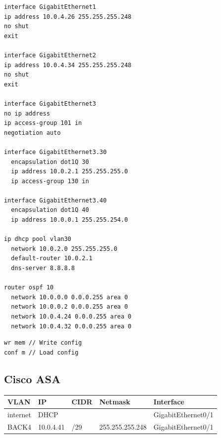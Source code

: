 \documentclass[11pt,parskip=half]{scrartcl}
\begin{document}
\begin{lstlisting}[basicstyle=\small, frame=single]
interface GigabitEthernet1
ip address 10.0.4.26 255.255.255.248
no shut
exit

interface GigabitEthernet2
ip address 10.0.4.34 255.255.255.248
no shut
exit

interface GigabitEthernet3
no ip address
ip access-group 101 in
negotiation auto

interface GigabitEthernet3.30
  encapsulation dot1Q 30
  ip address 10.0.2.1 255.255.255.0
  ip access-group 130 in

interface GigabitEthernet3.40
  encapsulation dot1Q 40
  ip address 10.0.0.1 255.255.254.0

ip dhcp pool vlan30
  network 10.0.2.0 255.255.255.0
  default-router 10.0.2.1
  dns-server 8.8.8.8

router ospf 10
  network 10.0.0.0 0.0.0.255 area 0
  network 10.0.0.2 0.0.0.255 area 0
  network 10.0.4.24 0.0.0.255 area 0
  network 10.0.4.32 0.0.0.255 area 0
\end{lstlisting}

\begin{verbatim}
wr mem // Write config
conf m // Load config 
\end{verbatim}

\subsection{{\bfseries\sffamily } Cisco ASA}
\label{sec:org441b035}

\begin{center}
\begin{tabular}{lllll}
VLAN & IP & CIDR & Netmask & Interface\\
\hline
internet & DHCP &  &  & GigabitEthernet0/1\\
BACK4 & 10.0.4.41 & /29 & 255.255.255.248 & GigabitEthernet0/1\\
\end{tabular}
\end{center}
\end{document}
